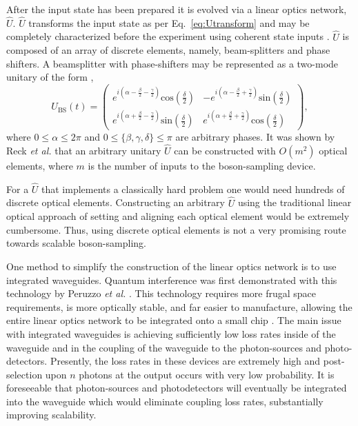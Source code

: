 \documentclass[aps,pra,twocolumn,amsmath,amssymb,nofootinbib,superscriptaddress]{revtex4}
\begin{document}
After the input state has been prepared it is evolved via a linear optics network, $\hat{U}$. $\hat{U}$ transforms the input state as per Eq.~\ref{eq:Utransform} and may be completely characterized before the experiment using coherent state inputs \cite{bib:PhysRevLett.73.58}. $\hat{U}$ is composed of an array of discrete elements, namely, beam-splitters and phase shifters. A beamsplitter with phase-shifters may be represented as a two-mode unitary of the form \cite{bib:GerryKnight05},
\begin{equation} \label{eq:BS}
U_{\mathrm{BS}}(t) = \left( \begin{array}{cc}
e^{i(\alpha-\frac{\beta}{2}-\frac{\gamma}{2})}\mathrm{cos}\left(\frac{\delta}{2}\right) & -e^{i(\alpha-\frac{\beta}{2}+\frac{\gamma}{2})}\mathrm{sin}\left(\frac{\delta}{2}\right)  \\
e^{i(\alpha+\frac{\beta}{2}-\frac{\gamma}{2})}\mathrm{sin}\left(\frac{\delta}{2}\right) & e^{i(\alpha+\frac{\beta}{2}+\frac{\gamma}{2})}\mathrm{cos}\left(\frac{\delta}{2}\right)
\end{array} \right), 
\end{equation}
where \mbox{$0\leq\alpha\leq2\pi$} and \mbox{$0\leq\{\beta,\gamma,\delta\}\leq\pi$} are arbitrary phases. It was shown by Reck \emph{et al.} \cite{bib:Reck94} that an arbitrary unitary $\hat{U}$ can be constructed with $O(m^2)$ optical elements, where $m$ is the number of inputs to the boson-sampling device.

For a $\hat{U}$ that implements a classically hard problem one would need hundreds of discrete optical elements. Constructing an arbitrary $\hat{U}$ using the traditional linear optical approach of setting and aligning each optical element would be extremely cumbersome. Thus, using discrete optical elements is not a very promising route towards scalable boson-sampling.

One method to simplify the construction of the linear optics network is to use integrated waveguides. Quantum interference was first demonstrated with this technology by Peruzzo \emph{et al.} \cite{bib:peruzzo2011multimode}. This technology requires more frugal space requirements, is more optically stable, and far easier to manufacture, allowing the entire linear optics network to be integrated onto a small chip \cite{bib:Politi02052008, bib:matthews2009, bib:Politi04092009}. The main issue with integrated waveguides is achieving sufficiently low loss rates inside of the waveguide and in the coupling of the waveguide to the photon-sources and photo-detectors. Presently, the loss rates in these devices are extremely high and post-selection upon $n$ photons at the output occurs with very low probability. It is foreseeable that photon-sources and photodetectors will eventually be integrated into the waveguide which would eliminate coupling loss rates, substantially improving scalability.   
\end{document}
